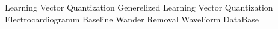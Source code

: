 	{ Learning Vector Quantization }
	{ Generelized Learning Vector Quantization }
	{ Electrocardiogramm }
	{ Baseline Wander Removal }
	{ WaveForm DataBase }

